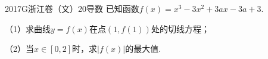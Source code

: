
\begin{problem}{2017}{G}{浙江卷（文）}{20}{导数}
已知函数$f(x)=x^3-3x^2+3ax-3a+3$.

（1）求曲线$y=f(x)$在点$(1,f(1))$处的切线方程；

（2）当$x\in[0,2]$时，求$|f(x)|$的最大值.
\end{problem}